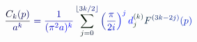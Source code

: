 \documentclass[12pt]{article}
\begin{document}
\makeatletter
\renewcommand*{\@textcolor}[3]{%
  \protect\leavevmode
  \begingroup
    \color#1{#2}#3%
  \endgroup
}
\makeatother
\begin{displaymath}
\mathcolor[RGB]{0,0,15}{\frac { \mathcolor[RGB]{0,0,30}{C} _ { \mathcolor[RGB]{0,0,45}{k} } \mathcolor[RGB]{0,0,60}{(} \mathcolor[RGB]{0,0,75}{p} \mathcolor[RGB]{0,0,90}{)} } { \mathcolor[RGB]{0,0,105}{a} ^ { \mathcolor[RGB]{0,0,120}{k} } } } \mathcolor[RGB]{0,0,135}{=} \mathcolor[RGB]{0,0,150}{\frac { \mathcolor[RGB]{0,0,165}{1} } { \mathcolor[RGB]{0,0,180}{(} \mathcolor[RGB]{0,0,195}{\pi} ^ { \mathcolor[RGB]{0,0,210}{2} } \mathcolor[RGB]{0,0,225}{a} \mathcolor[RGB]{0,0,240}{)} ^ { \mathcolor[RGB]{0,0,255}{k} } } } \mathcolor[RGB]{0,15,0}{\sum} _ { \mathcolor[RGB]{0,15,15}{j} \mathcolor[RGB]{0,15,30}{=} \mathcolor[RGB]{0,15,45}{0} } ^ { \mathcolor[RGB]{0,15,60}{\lfloor} \mathcolor[RGB]{0,15,75}{3} \mathcolor[RGB]{0,15,90}{k} \mathcolor[RGB]{0,15,105}{/} \mathcolor[RGB]{0,15,120}{2} \mathcolor[RGB]{0,15,135}{\rfloor} } \mathcolor[RGB]{0,15,150}{\left(} \mathcolor[RGB]{0,15,165}{\frac { \mathcolor[RGB]{0,15,180}{\pi} } { \mathcolor[RGB]{0,15,195}{2} \mathcolor[RGB]{0,15,210}{i} } } \mathcolor[RGB]{0,15,225}{\right)} ^ { \mathcolor[RGB]{0,15,240}{j} } \mathcolor[RGB]{0,15,255}{d} _ { \mathcolor[RGB]{0,30,0}{j} } ^ { \mathcolor[RGB]{0,30,15}{(} \mathcolor[RGB]{0,30,30}{k} \mathcolor[RGB]{0,30,45}{)} } \mathcolor[RGB]{0,30,60}{F} ^ { \mathcolor[RGB]{0,30,75}{(} \mathcolor[RGB]{0,30,90}{3} \mathcolor[RGB]{0,30,105}{k} \mathcolor[RGB]{0,30,120}{-} \mathcolor[RGB]{0,30,135}{2} \mathcolor[RGB]{0,30,150}{j} \mathcolor[RGB]{0,30,165}{)} } \mathcolor[RGB]{0,30,180}{(} \mathcolor[RGB]{0,30,195}{p} \mathcolor[RGB]{0,30,210}{)}
\end{displaymath}
\end{document}
